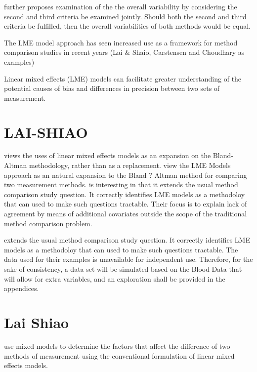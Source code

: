\documentclass[12pt, a4paper]{report}
\theoremstyle{plain}
\theoremstyle{definition}
\theoremstyle{remark}
\begin{document}
\citet{ARoy2009} further proposes examination of the the overall variability by considering the second and third criteria be examined jointly. Should both the second and third criteria be fulfilled, then the overall variabilities of both methods would be equal.



The LME model approach has seen increased use as a framework for method comparison studies in recent years (Lai $\&$ Shaio, Carstensen and Choudhary as examples)


Linear mixed effects (LME) models can facilitate greater
understanding of the potential causes of bias and differences in
precision between two sets of measurement. 

\section{LAI-SHIAO}
\citet{LaiShiao} views
the uses of linear mixed effects models as an expansion on the
Bland-Altman methodology, rather than as a replacement.\citet{LaiShiao} view the LME Models approach as an natural expansion to the Bland ? Altman method for comparing two measurement methods. \citet{LaiShiao} is interesting in that it extends the usual method comparison study question. It correctly identifies LME models as a methodoloy that can used to make such questions tractable. Their focus is to explain lack of agreement by means of additional covariates outside the scope of the traditional method comparison problem. 	

\citet{LaiShiao} extends the usual method comparison study question. It correctly identifies LME models as a methodoloy that can used to make such questions tractable. The data used for their examples is unavailable for independent use. Therefore, for the sake of consistency, a data set will be simulated based on the Blood Data that will allow for extra variables, and an exploration shall be provided in the appendices.


\section{Lai Shiao}
\citet{LaiShiao} use mixed models to determine the factors that
affect the difference of two methods of measurement using the
conventional formulation of linear mixed effects models.
\end{document}
